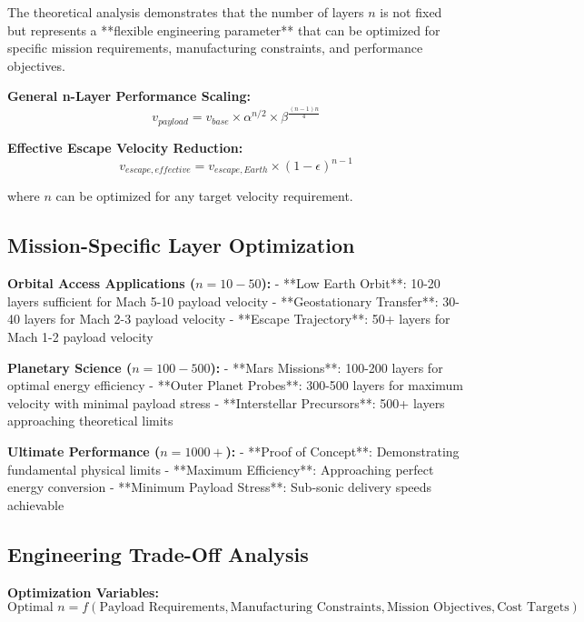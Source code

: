 \documentclass[12pt,a4paper]{article}
\begin{document}
The theoretical analysis demonstrates that the number of layers $n$ is not fixed but represents a **flexible engineering parameter** that can be optimized for specific mission requirements, manufacturing constraints, and performance objectives.

\textbf{General n-Layer Performance Scaling:}
\begin{equation}
v_{payload} = v_{base} \times \alpha^{n/2} \times \beta^{\frac{(n-1)n}{4}}
\end{equation}

\textbf{Effective Escape Velocity Reduction:}
\begin{equation}
v_{escape,effective} = v_{escape,Earth} \times (1 - \epsilon)^{n-1}
\end{equation}

where $n$ can be optimized for any target velocity requirement.

\subsection{Mission-Specific Layer Optimization}

\textbf{Orbital Access Applications ($n = 10-50$):}
- **Low Earth Orbit**: 10-20 layers sufficient for Mach 5-10 payload velocity
- **Geostationary Transfer**: 30-40 layers for Mach 2-3 payload velocity
- **Escape Trajectory**: 50+ layers for Mach 1-2 payload velocity

\textbf{Planetary Science ($n = 100-500$):}
- **Mars Missions**: 100-200 layers for optimal energy efficiency
- **Outer Planet Probes**: 300-500 layers for maximum velocity with minimal payload stress
- **Interstellar Precursors**: 500+ layers approaching theoretical limits

\textbf{Ultimate Performance ($n = 1000+$):}
- **Proof of Concept**: Demonstrating fundamental physical limits
- **Maximum Efficiency**: Approaching perfect energy conversion
- **Minimum Payload Stress**: Sub-sonic delivery speeds achievable

\subsection{Engineering Trade-Off Analysis}

\textbf{Optimization Variables:}
\begin{equation}
\text{Optimal }n = f(\text{Payload Requirements}, \text{Manufacturing Constraints}, \text{Mission Objectives}, \text{Cost Targets})
\end{equation}
\end{document}

